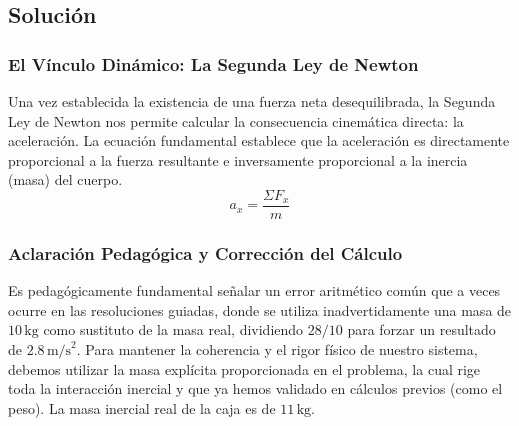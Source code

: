 \documentclass[12pt]{article}
\begin{document}
\begin{center}
\end{center}

\subsection*{Solución}

\subsubsection*{El Vínculo Dinámico: La Segunda Ley de Newton}
Una vez establecida la existencia de una fuerza neta desequilibrada, la Segunda Ley de Newton nos permite calcular la consecuencia cinemática directa: la aceleración. La ecuación fundamental establece que la aceleración es directamente proporcional a la fuerza resultante e inversamente proporcional a la inercia (masa) del cuerpo.
\begin{equation}
    a_x = \frac{\Sigma F_x}{m}
\end{equation}

\subsubsection*{Aclaración Pedagógica y Corrección del Cálculo}
Es pedagógicamente fundamental señalar un error aritmético común que a veces ocurre en las resoluciones guiadas, donde se utiliza inadvertidamente una masa de $10 \, \text{kg}$ como sustituto de la masa real, dividiendo $28 / 10$ para forzar un resultado de $2.8 \, \text{m/s}^2$. Para mantener la coherencia y el rigor físico de nuestro sistema, debemos utilizar la masa explícita proporcionada en el problema, la cual rige toda la interacción inercial y que ya hemos validado en cálculos previos (como el peso). La masa inercial real de la caja es de $11 \, \text{kg}$.
\end{document}
